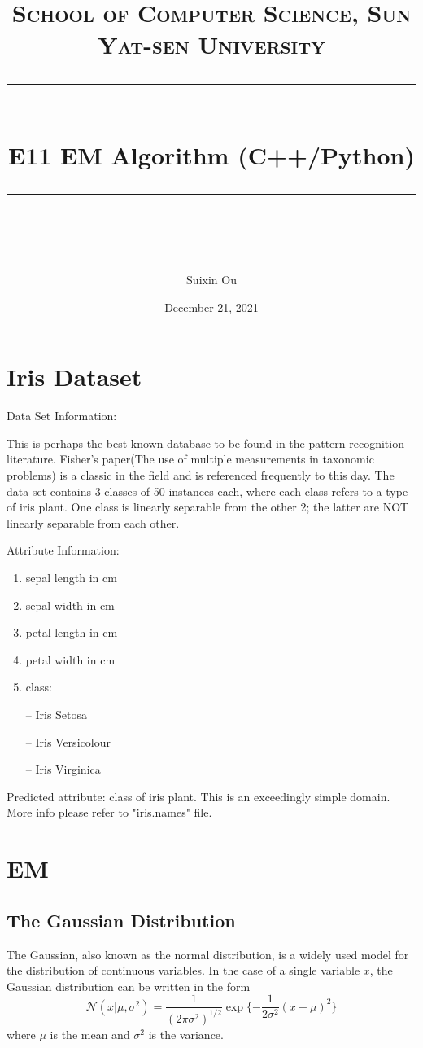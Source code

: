 ﻿\documentclass[a4paper, 11pt]{article}
\title{	
\normalfont \normalsize
\textsc{School of Computer Science, Sun Yat-sen University} \\ [25pt] %
\rule{\textwidth}{0.5pt} \\[0.4cm] %
\huge  E11 EM Algorithm (C++/Python)\\ %
\rule{\textwidth}{2pt} \\[0.5cm] %
\author{Suixin Ou}
\date{December 21, 2021}
}
\numberwithin{equation}{subsection}
\begin{document}
\maketitle
\tableofcontents
\newpage
\section{Iris Dataset}
Data Set Information:

This is perhaps the best known database to be found in the pattern recognition literature. Fisher's paper(The use of multiple measurements in taxonomic problems) is a classic in the field and is referenced frequently to this day. The data set contains 3 classes of 50 instances each, where each class refers to a type of iris plant. One class is linearly separable from the other 2; the latter are NOT linearly separable from each other.

Attribute Information:
\begin{enumerate}

\item sepal length in cm

\item sepal width in cm

\item petal length in cm

\item petal width in cm

\item class:

-- Iris Setosa

-- Iris Versicolour

-- Iris Virginica
\end{enumerate}


Predicted attribute: class of iris plant. This is an exceedingly simple domain. More info please refer to "iris.names" file.


\section{EM}
\subsection{The Gaussian Distribution}
The Gaussian, also known as the normal distribution, is a widely used model for the distribution of continuous variables. In the case of a single variable $x$, the Gaussian distribution can be written in the form
\begin{equation}
\mathcal N(x|\mu,\sigma^2)=\frac{1}{(2\pi\sigma^2)^{1/2}}\exp\{-\frac{1}{2\sigma^2}(x-\mu)^2\}
\end{equation}
where $\mu$ is the mean and $\sigma^2$ is the variance. 
\end{document}
